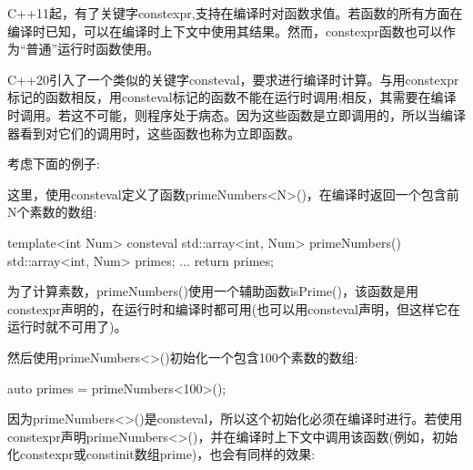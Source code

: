 
C++11起，有了关键字constexpr,支持在编译时对函数求值。若函数的所有方面在编译时已知，可以在编译时上下文中使用其结果。然而，constexpr函数也可以作为“普通”运行时函数使用。

C++20引入了一个类似的关键字consteval，要求进行编译时计算。与用constexpr标记的函数相反，用consteval标记的函数不能在运行时调用;相反，其需要在编译时调用。若这不可能，则程序处于病态。因为这些函数是立即调用的，所以当编译器看到对它们的调用时，这些函数也称为立即函数。


考虑下面的例子:



这里，使用consteval定义了函数primeNumbers<N>()，在编译时返回一个包含前N个素数的数组:

\begin{cpp}
template<int Num>
consteval
std::array<int, Num> primeNumbers()
{
	std::array<int, Num> primes;
	...
	return primes;
}
\end{cpp}

为了计算素数，primeNumbers()使用一个辅助函数isPrime()，该函数是用constexpr声明的，在运行时和编译时都可用(也可以用consteval声明，但这样它在运行时就不可用了)。

然后使用primeNumbers<>()初始化一个包含100个素数的数组:

\begin{cpp}
auto primes = primeNumbers<100>();
\end{cpp}

因为primeNumbers<>()是consteval，所以这个初始化必须在编译时进行。若使用constexpr声明primeNumbers<>()，并在编译时上下文中调用该函数(例如，初始化constexpr或constinit数组prime)，也会有同样的效果:

